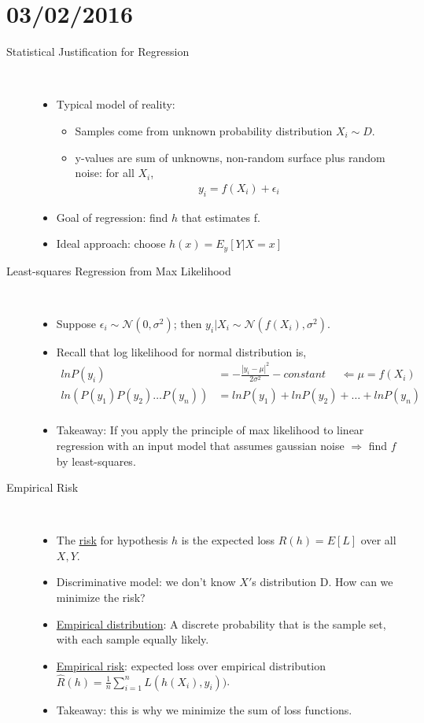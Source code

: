 \documentclass[10pt]{article}
\begin{document}
\newpage
\section*{03/02/2016}
\begin{description}
	\item[Statistical Justification for Regression]
	\
	\begin{itemize}
		\item Typical model of reality:
			\begin{itemize}
				\item Samples come from unknown probability distribution $X_{i} \sim D$.
				\item y-values are sum of unknowns, non-random surface plus random noise: for all $X_{i}$,
					\begin{align*}
						y_{i} = f(X_{i}) + \epsilon_{i}
					\end{align*}
			\end{itemize}
		\item Goal of regression: find $h$ that estimates f.
		\item Ideal approach: choose $h(x) = E_{y}[Y | X=x]$
	\end{itemize} 
	
	\item[Least-squares Regression from Max Likelihood]
	\
	\begin{itemize}
		\item Suppose $\epsilon_{i} \sim \mathcal{N}(0, \sigma^{2})$; then $y_{i}|X_{i} \sim \mathcal{N}(f(X_{i}), \sigma^{2})$.
		\item Recall that log likelihood for normal distribution is,
			\begin{align*}
				ln P(y_{i}) &= - \frac{|y_{i} - \mu|^{2}}{2\sigma^{2}} - constant \ \ \ \ \ \ \Leftarrow \mu = f(X_{i})\\
				ln(P(y_{1})P(y_{2}) \dots P(y_{n})) &= ln P(y_{1}) + ln P(y_{2}) + \dots + ln P(y_{n})\\
			\end{align*}
		\item Takeaway: If you apply the principle of max likelihood to linear regression with an input model that assumes gaussian noise $\Rightarrow$ find $f$ by least-squares. 
	\end{itemize}
	
	\item[Empirical Risk]
	\
	\begin{itemize}
		\item The \underline{risk} for hypothesis $h$ is the expected loss $R(h) = E[L]$ over all $X, Y$.
		\item Discriminative model: we don't know $X'$s distribution D. How can we minimize the risk?
		\item \underline{Empirical distribution}: A discrete probability that is the sample set, with each sample equally likely.
		\item \underline{Empirical risk}: expected loss over empirical distribution $\hat{R}(h) = \frac{1}{n} \sum_{i=1}^{n} L(h(X_{i}), y_{i}))$.
		\item Takeaway: this is why we minimize the sum of loss functions.
	\end{itemize}
	

\end{description}
\end{document}
